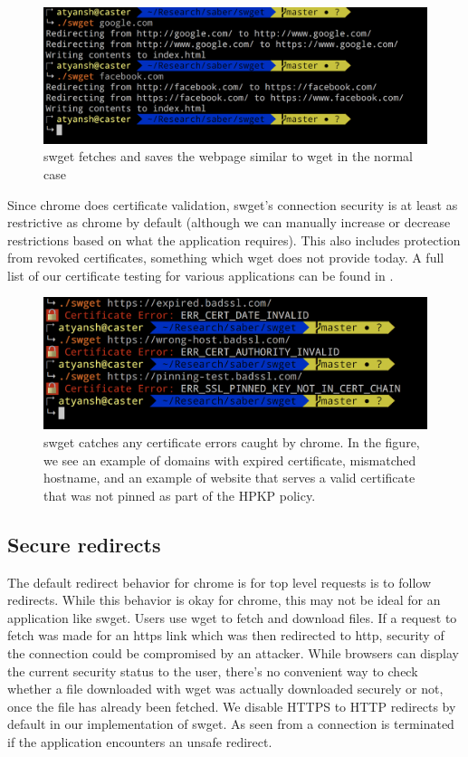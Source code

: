 \begin{figure}[h]
  \includegraphics[width=\textwidth]{figures/regular}
  \caption[Regular usage of swget]{swget fetches and saves the webpage similar
  to wget in the normal case}
  \label{fig:regular-saber}
\end{figure}

Since chrome does certificate validation, swget's connection security is at
least as restrictive as chrome by default (although we can manually increase or
decrease restrictions based on what the application requires). This also
includes protection from revoked certificates, something which wget does not
provide today. A full list of our certificate testing for various applications
can be found in .

\begin{figure}[h]
  \includegraphics[width=\textwidth]{figures/cert-error}
  \caption[Behavior on certificate errors]{swget catches any certificate errors
  caught by chrome. In the figure, we see an example of domains with expired
  certificate, mismatched hostname, and an example of website that serves a
  valid certificate that was not pinned as part of the HPKP policy.} 
  \label{fig:cert-error-saber}
\end{figure}


\subsection{Secure redirects}
The default redirect behavior for chrome is for top level requests is to follow
redirects. While this behavior is okay for chrome, this may not be ideal for an
application like swget. Users use wget to fetch and download files. If a
request to fetch was made for an https link which was then redirected to http,
security of the connection could be compromised by an attacker. While browsers
can display the current security status to the user, there's no convenient way
to check whether a file downloaded with wget was actually downloaded securely
or not, once the file has already been fetched. We disable HTTPS to HTTP
redirects by default in our implementation of swget. As seen from
 a connection is terminated if the application
encounters an unsafe redirect.

